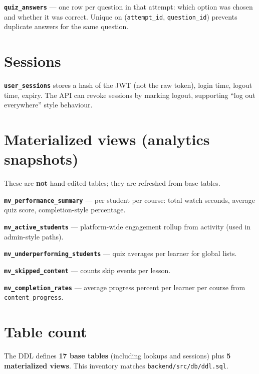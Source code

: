\textbf{\texttt{quiz\_answers}} --- one row per question in that attempt: which option was chosen and whether it was correct. Unique on (\texttt{attempt\_id}, \texttt{question\_id}) prevents duplicate answers for the same question.

\section{Sessions}
\textbf{\texttt{user\_sessions}} stores a hash of the JWT (not the raw token), login time, logout time, expiry. The API can revoke sessions by marking logout, supporting ``log out everywhere'' style behaviour.

\section{Materialized views (analytics snapshots)}
These are \textbf{not} hand-edited tables; they are refreshed from base tables.

\textbf{\texttt{mv\_performance\_summary}} --- per student per course: total watch seconds, average quiz score, completion-style percentage.

\textbf{\texttt{mv\_active\_students}} --- platform-wide engagement rollup from activity (used in admin-style paths).

\textbf{\texttt{mv\_underperforming\_students}} --- quiz averages per learner for global lists.

\textbf{\texttt{mv\_skipped\_content}} --- counts skip events per lesson.

\textbf{\texttt{mv\_completion\_rates}} --- average progress percent per learner per course from \texttt{content\_progress}.

\section{Table count}
The DDL defines \textbf{17 base tables} (including lookups and sessions) plus \textbf{5 materialized views}. This inventory matches \texttt{backend/src/db/ddl.sql}.
